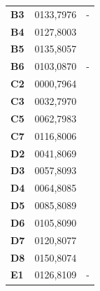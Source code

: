 \documentclass{article}
\begin{document}
\begin{CJK*}{UTF8}{bkai}
\begin{multicols}{2}
\begin{tabular}{|l|c|l|}
	\hline
	\textbf{B3}&0133,7976&-\\
	\textbf{B4}&0127,8003&\\
	\textbf{B5}&0135,8057&\\
	\textbf{B6}&0103,0870&-\\
	\hline
	\textbf{C2}&0000,7964&\\
	\textbf{C3}&0032,7970&\\
	\textbf{C5}&0062,7983&\\
	\textbf{C7}&0116,8006&\\
	\hline
	\textbf{D2}&0041,8069&\\
	\textbf{D3}&0057,8093&\\
	\textbf{D4}&0064,8085&\\
	\textbf{D5}&0085,8089&\\
	\textbf{D6}&0105,8090&\\
	\textbf{D7}&0120,8077&\\
	\textbf{D8}&0150,8074&\\
	\hline
	\textbf{E1}&0126,8109&-\\
	\hline
\end{tabular}
\cleardoublepage


\end{multicols}
\end{CJK*}
\end{document}
